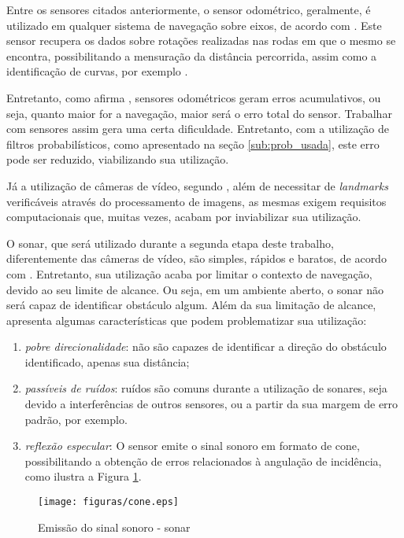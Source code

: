 			Entre os sensores citados anteriormente, o sensor odométrico, geralmente, é utilizado em qualquer sistema de navegação sobre eixos, de acordo com \cite{explore_marte}. Este sensor recupera os dados sobre rotações realizadas nas rodas em que o mesmo se encontra, possibilitando a mensuração da distância percorrida, assim como a identificação de curvas, por exemplo \cite{ROB:1764504}. 

			Entretanto, como afirma \cite{iterated_Dslam}, sensores odométricos geram erros acumulativos, ou seja, quanto maior for a navegação, maior será o erro total do sensor. Trabalhar com sensores assim gera uma certa dificuldade. Entretanto, com a utilização de filtros probabilísticos, como apresentado na seção \ref{sub:prob_usada}, este erro pode ser reduzido, viabilizando sua utilização.

			Já a utilização de câmeras de vídeo, segundo \cite{agenteExploratorioKalman}, além de necessitar de \textit{landmarks} verificáveis através do processamento de imagens, as mesmas exigem requisitos computacionais que, muitas vezes, acabam por inviabilizar sua utilização.

			O sonar, que será utilizado durante a segunda etapa deste trabalho, diferentemente das câmeras de vídeo, são simples, rápidos e baratos, de acordo com \cite{agenteExploratorioKalman}. Entretanto, sua utilização acaba por limitar o contexto de navegação, devido ao seu limite de alcance. Ou seja, em um ambiente aberto, o sonar não será capaz de identificar obstáculo algum. Além da sua limitação de alcance, \cite{agenteExploratorioKalman} apresenta algumas características que podem problematizar sua utilização:

			\begin{enumerate}
				\item \textit{pobre direcionalidade}: não são capazes de identificar a direção do obstáculo identificado, apenas sua distância;
				\item \textit{passíveis de ruídos}: ruídos são comuns durante a utilização de sonares, seja devido a interferências de outros sensores, ou a partir da sua margem de erro padrão, por exemplo.
				\item \textit{reflexão especular}: O sensor emite o sinal sonoro em formato de cone, possibilitando a obtenção de erros relacionados à angulação de incidência, como ilustra a Figura \ref{img:cone}. 
			\end{enumerate}

			\begin{figure}[H]
				\centering
				\texttt{[image: figuras/cone.eps]}
				\caption[Emissão do sinal sonoro - sonar]{Emissão do sinal sonoro - sonar}
				\label{img:cone}
			\end{figure}

